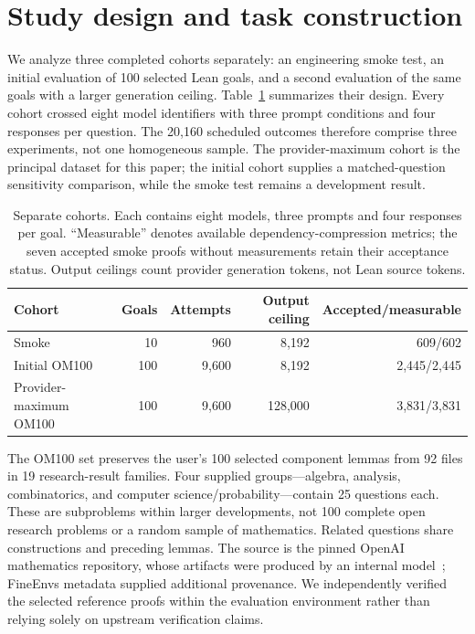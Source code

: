 \documentclass[11pt]{article}
\begin{document}
\section{Study design and task construction}
\label{sec:methods-design}

We analyze three completed cohorts separately: an engineering smoke test, an initial evaluation of 100 selected Lean goals, and a second evaluation of the same goals with a larger generation ceiling. Table~\ref{tab:methods-cohorts} summarizes their design. Every cohort crossed eight model identifiers with three prompt conditions and four responses per question. The 20,160 scheduled outcomes therefore comprise three experiments, not one homogeneous sample. The provider-maximum cohort is the principal dataset for this paper; the initial cohort supplies a matched-question sensitivity comparison, while the smoke test remains a development result.

\begin{table}[tbp]
\centering
\small
\begin{tabular}{lrrrr}
\hline
Cohort & Goals & Attempts & Output ceiling & Accepted/measurable \\
\hline
Smoke & 10 & 960 & 8,192 & 609/602 \\
Initial OM100 & 100 & 9,600 & 8,192 & 2,445/2,445 \\
Provider-maximum OM100 & 100 & 9,600 & 128,000 & 3,831/3,831 \\
\hline
\end{tabular}
\caption{Separate cohorts. Each contains eight models, three prompts and four responses per goal. ``Measurable'' denotes available dependency-compression metrics; the seven accepted smoke proofs without measurements retain their acceptance status. Output ceilings count provider generation tokens, not Lean source tokens.}
\label{tab:methods-cohorts}
\end{table}

The OM100 set preserves the user's 100 selected component lemmas from 92 files in 19 research-result families. Four supplied groups---algebra, analysis, combinatorics, and computer science/probability---contain 25 questions each. These are subproblems within larger developments, not 100 complete open research problems or a random sample of mathematics. Related questions share constructions and preceding lemmas. The source is the pinned OpenAI mathematics repository, whose artifacts were produced by an internal model~\cite{openaimath}; FineEnvs metadata supplied additional provenance. We independently verified the selected reference proofs within the evaluation environment rather than relying solely on upstream verification claims.
\end{document}
